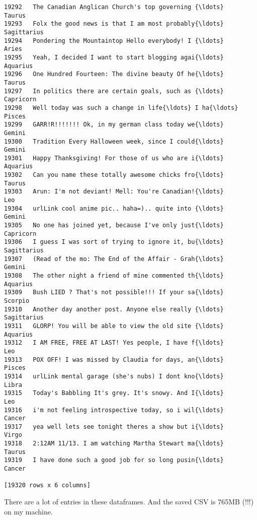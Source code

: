 \documentclass[11pt]{article}
\begin{document}
\begin{Verbatim}[commandchars=\\\{\}]
19292   The Canadian Anglican Church's top governing {\ldots}       Taurus  
19293   Folx the good news is that I am most probably{\ldots}  Sagittarius  
19294   Pondering the Mountaintop Hello everybody! I {\ldots}        Aries  
19295   Yeah, I decided I want to start blogging agai{\ldots}     Aquarius  
19296   One Hundred Fourteen: The divine beauty Of he{\ldots}       Taurus  
19297   In politics there are certain goals, such as {\ldots}    Capricorn  
19298   Well today was such a change in life{\ldots} I ha{\ldots}       Pisces  
19299   GARR!R!!!!!!! Ok, in my german class today we{\ldots}       Gemini  
19300   Tradition Every Halloween week, since I could{\ldots}       Gemini  
19301   Happy Thanksgiving! For those of us who are i{\ldots}     Aquarius  
19302   Can you name these totally awesome chicks fro{\ldots}       Taurus  
19303   Arun: I'm not deviant! Mell: You're Canadian!{\ldots}          Leo  
19304   urlLink cool anime pic.. haha=).. quite into {\ldots}       Gemini  
19305   No one has joined yet, because I've only just{\ldots}    Capricorn  
19306   I guess I was sort of trying to ignore it, bu{\ldots}  Sagittarius  
19307   (Read of the mo: The End of the Affair - Grah{\ldots}       Gemini  
19308   The other night a friend of mine commented th{\ldots}     Aquarius  
19309   Bush LIED ? That's not possible!!! If your sa{\ldots}      Scorpio  
19310   Another day another post. Anyone else really {\ldots}  Sagittarius  
19311   GLORP! You will be able to view the old site {\ldots}     Aquarius  
19312   I AM FREE, FREE AT LAST! Yes people, I have f{\ldots}          Leo  
19313   POX OFF! I was missed by Claudia for days, an{\ldots}       Pisces  
19314   urlLink mental garage (she's nubs) I dont kno{\ldots}        Libra  
19315   Today's Babbling It's grey. It's snowy. And I{\ldots}          Leo  
19316   i'm not feeling introspective today, so i wil{\ldots}       Cancer  
19317   yea well lets see tonight theres a show but i{\ldots}        Virgo  
19318   2:12AM 11/13. I am watching Martha Stewart ma{\ldots}       Taurus  
19319   I have done such a good job for so long pusin{\ldots}       Cancer  

[19320 rows x 6 columns]

    \end{Verbatim}

    There are a lot of entries in these dataframes. And the saved CSV is
765MB (!!!) on my machine.
\end{document}
